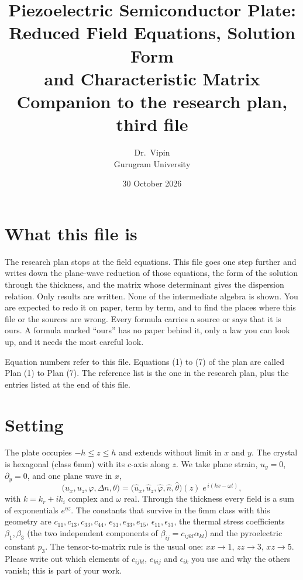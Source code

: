 \documentclass[11pt]{article}
\title{\vspace{-1.6cm}\Large Piezoelectric Semiconductor Plate: Reduced Field Equations, Solution Form\\
and Characteristic Matrix\\[8pt]\large Companion to the research plan, third file}
\author{Dr.\ Vipin \\ Gurugram University}
\date{30 October 2026}
\begin{document}
\maketitle
\vspace{-6mm}

\section{What this file is}

The research plan stops at the field equations. This file goes one step further and writes down the
plane-wave reduction of those equations, the form of the solution through the thickness, and the matrix whose
determinant gives the dispersion relation. Only results are written. None of the intermediate algebra is
shown. You are expected to redo it on paper, term by term, and to find the places where this file or the
sources are wrong. Every formula carries a source or says that it is ours. A formula marked ``ours'' has no
paper behind it, only a law you can look up, and it needs the most careful look.

Equation numbers refer to this file. Equations (1) to (7) of the plan are called Plan (1) to Plan (7).
The reference list is the one in the research plan, plus the entries listed at the end of this file.

\section{Setting}

The plate occupies $-h\le z\le h$ and extends without limit in $x$ and $y$. The crystal is hexagonal
(class 6mm) with its $c$-axis along $z$. We take plane strain, $u_y=0$, $\partial_y=0$, and one plane wave in
$x$,
\begin{equation}
\bigl(u_x,u_z,\varphi,\Delta n,\theta\bigr)
=\bigl(\hat u_x,\hat u_z,\hat\varphi,\hat n,\hat\theta\bigr)(z)\;e^{\,i(kx-\omega t)} ,
\label{eq:ansatz}
\end{equation}
with $k=k_r+ik_i$ complex and $\omega$ real. Through the thickness every field is a sum of exponentials
$e^{\eta z}$. The constants that survive in the 6mm class with this geometry are $c_{11},c_{13},c_{33},c_{44}$,
$e_{31},e_{33},e_{15}$, $\epsilon_{11},\epsilon_{33}$, the thermal stress coefficients $\beta_1,\beta_3$
(the two independent components of $\beta_{ij}=c_{ijkl}\alpha_{kl}$) and the pyroelectric constant $p_3$.
The tensor-to-matrix rule is the usual one: $xx\to1$, $zz\to3$, $xz\to5$. Please write out which elements
of $c_{ijkl}$, $e_{kij}$ and $\epsilon_{ik}$ you use and why the others vanish; this is part of your work.
\end{document}
